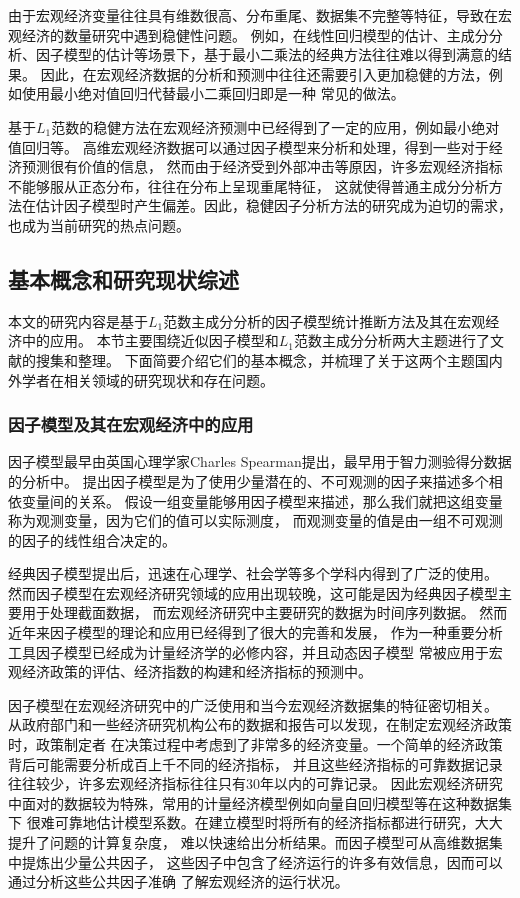 由于宏观经济变量往往具有维数很高、分布重尾、数据集不完整等特征\cite{qiu2015robust}，导致在宏观经济的数量研究中遇到稳健性问题。
例如，在线性回归模型的估计、主成分分析、因子模型的估计等场景下，基于最小二乘法的经典方法往往难以得到满意的结果。
因此，在宏观经济数据的分析和预测中往往还需要引入更加稳健的方法，例如使用最小绝对值回归代替最小二乘回归即是一种
常见的做法。

基于$L_1$范数的稳健方法在宏观经济预测中已经得到了一定的应用，例如最小绝对值回归等。
高维宏观经济数据可以通过因子模型来分析和处理，得到一些对于经济预测很有价值的信息，
然而由于经济受到外部冲击等原因，许多宏观经济指标不能够服从正态分布，往往在分布上呈现重尾特征，
这就使得普通主成分分析方法在估计因子模型时产生偏差。因此，稳健因子分析方法的研究成为迫切的需求，
也成为当前研究的热点问题。

\subsection{基本概念和研究现状综述}
本文的研究内容是基于$L_1$范数主成分分析的因子模型统计推断方法及其在宏观经济中的应用。
本节主要围绕近似因子模型和$L_1$范数主成分分析两大主题进行了文献的搜集和整理。
下面简要介绍它们的基本概念，并梳理了关于这两个主题国内外学者在相关领域的研究现状和存在问题。

\subsubsection{因子模型及其在宏观经济中的应用}
因子模型最早由英国心理学家Charles Spearman提出，最早用于智力测验得分数据的分析中。
提出因子模型是为了使用少量潜在的、不可观测的因子来描述多个相依变量间的关系。
假设一组变量能够用因子模型来描述，那么我们就把这组变量称为观测变量，因为它们的值可以实际测度，
而观测变量的值是由一组不可观测的因子的线性组合决定的。

经典因子模型提出后，迅速在心理学、社会学等多个学科内得到了广泛的使用。
然而因子模型在宏观经济研究领域的应用出现较晚，这可能是因为经典因子模型主要用于处理截面数据，
而宏观经济研究中主要研究的数据为时间序列数据。
然而近年来因子模型的理论和应用已经得到了很大的完善和发展，
作为一种重要分析工具因子模型已经成为计量经济学的必修内容，并且动态因子模型
常被应用于宏观经济政策的评估、经济指数的构建和经济指标的预测中。

因子模型在宏观经济研究中的广泛使用和当今宏观经济数据集的特征密切相关。
从政府部门和一些经济研究机构公布的数据和报告可以发现，在制定宏观经济政策时，政策制定者
在决策过程中考虑到了非常多的经济变量。一个简单的经济政策背后可能需要分析成百上千不同的经济指标，
并且这些经济指标的可靠数据记录往往较少，许多宏观经济指标往往只有30年以内的可靠记录。
因此宏观经济研究中面对的数据较为特殊，常用的计量经济模型例如向量自回归模型等在这种数据集下
很难可靠地估计模型系数。在建立模型时将所有的经济指标都进行研究，大大提升了问题的计算复杂度，
难以快速给出分析结果。而因子模型可从高维数据集中提炼出少量公共因子，
这些因子中包含了经济运行的许多有效信息，因而可以通过分析这些公共因子准确
了解宏观经济的运行状况。

